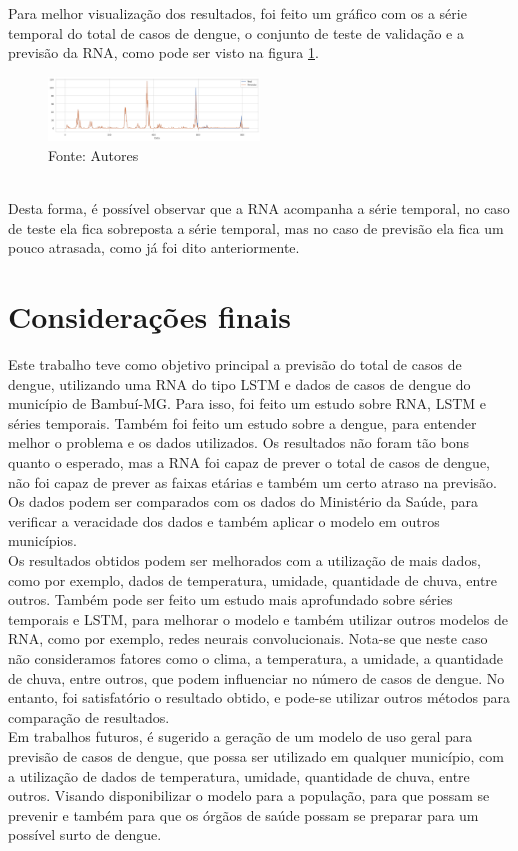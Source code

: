 \documentclass[
	article,			%
	12pt,				%
	a4paper,			%
	chapter=TITLE,		%
	section=TITLE,		%
	subsection=TITLE,	%
	subsubsection=TITLE %
	english,			%
	brazil,				%
	sumario=tradicional
	]{abntex2}
\begin{document}
Para melhor visualização dos resultados, foi feito um gráfico com os a série temporal do total de casos de dengue, o conjunto de teste de validação e a previsão da RNA, como pode ser visto na figura \ref{figure7}. 
\begin{figure}[htbp]
	\centering
	\includegraphics[width=0.5\textwidth]{imagens/imgCodigos/previsaoFullCasosTotais.png}
	\caption{Fonte: Autores}
	\label{figure7}
\end{figure}
\\ \indent
Desta forma, é possível observar que a RNA acompanha a série temporal, no caso de teste ela fica sobreposta a série temporal, mas no caso de previsão ela fica um pouco atrasada, como já foi dito anteriormente.
\\ \indent

 
\section{Considerações finais}
Este trabalho teve como objetivo principal a previsão do total de casos de dengue, utilizando uma RNA do tipo LSTM e dados de casos de dengue do município de Bambuí-MG. Para isso, foi feito um estudo sobre RNA, LSTM e séries temporais. Também foi feito um estudo sobre a dengue, para entender melhor o problema e os dados utilizados. Os resultados não foram tão bons quanto o esperado, mas a RNA foi capaz de prever o total de casos de dengue, não foi capaz de prever as faixas etárias e também um certo atraso na previsão. Os dados podem ser comparados com os dados do Ministério da Saúde, para verificar a veracidade dos dados e também aplicar o modelo em outros municípios. 
\\ \indent
Os resultados obtidos podem ser melhorados com a utilização de mais dados, como por exemplo, dados de temperatura, umidade, quantidade de chuva, entre outros. Também pode ser feito um estudo mais aprofundado sobre séries temporais e LSTM, para melhorar o modelo e também utilizar outros modelos de RNA, como por exemplo, redes neurais convolucionais. Nota-se que neste caso não consideramos fatores como o clima, a temperatura, a umidade, a quantidade de chuva, entre outros, que podem influenciar no número de casos de dengue. No entanto, foi satisfatório o resultado obtido, e pode-se utilizar outros métodos para comparação de resultados. 
\\ \indent
Em trabalhos futuros, é sugerido a geração de um modelo de uso geral para previsão de casos de dengue, que possa ser utilizado em qualquer município, com a utilização de dados de temperatura, umidade, quantidade de chuva, entre outros. Visando disponibilizar o modelo para a população, para que possam se prevenir e também para que os órgãos de saúde possam se preparar para um possível surto de dengue.
\end{document}
